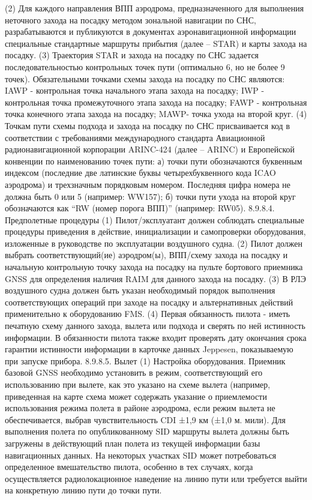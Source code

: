 (2) Для каждого направления ВПП аэродрома, предназначенного для выполнения неточного захода на посадку методом зональной навигации по СНС, разрабатываются и публикуются в документах аэронавигационной информации специальные стандартные маршруты прибытия (далее – STAR) и карты захода на посадку.
(3) Траектория STAR и захода на посадку по СНС задается последовательностью контрольных точек пути (оптимально 6, но не более 9 точек). Обязательными точками схемы захода на посадку по СНС являются:
IAWP - контрольная точка начального этапа захода на посадку;
IWP    - контрольная точка промежуточного этапа захода на посадку;
FAWP - контрольная точка конечного этапа захода на посадку;
MAWP- точка ухода на второй круг.
(4) Точкам пути схемы подхода и захода на посадку по СНС присваивается код в соответствии с требованиями международного стандарта Авиационной радионавигационной корпорации ARINC-424 (далее – ARINC) и Европейской конвенции по наименованию точек пути:
а)	точки пути обозначаются буквенным индексом (последние две латинские буквы четырехбуквенного кода ICAO аэродрома) и трехзначным порядковым номером. Последняя цифра номера не должна быть 0 или 5 (например: WW157);
б)	точки пути ухода на второй круг обозначаются как “RW (номер порога ВПП)” (например: RW05).
8.9.8.4.	Предполетные процедуры
(1) Пилот/эксплуатант должен соблюдать специальные процедуры приведения в действие, инициализации и самопроверки оборудования, изложенные в руководстве по эксплуатации воздушного судна.
(2) Пилот должен выбрать соответствующий(ие) аэродром(ы), ВПП/схему захода на посадку и начальную контрольную точку захода на посадку на пульте бортового приемника GNSS для определения наличия RAIM для данного захода на посадку. 
(3) В РЛЭ воздушного судна должен быть указан необходимый порядок выполнения соответствующих операций при заходе на посадку и альтернативных действий применительно к оборудованию FMS.
(4) Первая обязанность пилота - иметь печатную схему данного захода, вылета или подхода и сверять по ней истинность информации. В обязанности пилота также входит проверять дату окончания срока гарантии истинности информации в карточке данных Jeppesen, показываемую при запуске прибора.
8.9.8.5.	Вылет
(1) Настройка оборудования.
Приемник базовой GNSS необходимо установить в режим, соответствующий его использованию при вылете, как это указано на схеме вылета (например, приведенная на карте схема может содержать указание о приемлемости использования режима полета в районе аэродрома, если режим вылета не обеспечивается, выбрав чувствительность CDI ±1,9 км (±1,0 м. мили). Для выполнения полета по опубликованному SID маршруты вылета должны быть загружены в действующий план полета из текущей информации базы навигационных данных. На некоторых участках SID может потребоваться определенное вмешательство пилота, особенно в тех случаях, когда осуществляется радиолокационное наведение на линию пути или требуется выйти на конкретную линию пути до точки пути.
